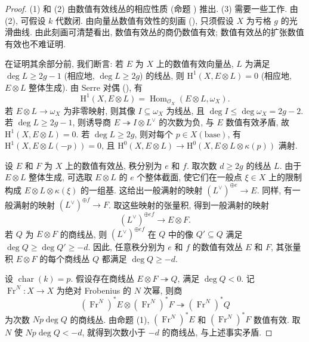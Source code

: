 \begin{proof}
(1) 和 (2) 由数值有效线丛的相应性质 (命题 ) 推出. (3) 需要一些工作. 由 (2), 可假设 $k$ 代数闭. 由向量丛数值有效性的刻画 (), 只须假设 $X$ 为亏格 $g$ 的光滑曲线. 由此刻画可清楚看出, 数值有效丛的商仍数值有效; 数值有效丛的扩张数值有效也不难证明.

在证明其余部分前, 我们断言: 若 $E$ 为 $X$ 上的数值有效向量丛, $L$ 为满足 $\deg L\geq2g-1$ (相应地, $\deg L\geq2g$) 的线丛, 则 $\mathrm H^1(X,E\otimes L)=0$ (相应地, $E\otimes L$ 整体生成). 由 Serre 对偶 (), 有
\[
\mathrm H^1(X,E\otimes L)=\operatorname{Hom}_{\mathcal O_X}(E\otimes L,\omega_X).
\]
若 $E\otimes L\to\omega_X$ 为非零映射, 则其像 $I\subseteq\omega_X$ 为线丛, 且 $\deg I\leq\deg\omega_X=2g-2$. 若 $\deg L\geq2g-1$, 则诱导商 $E\twoheadrightarrow I\otimes L^\vee$ 的次数为负, 与 $E$ 数值有效矛盾, 故 $\mathrm H^1(X,E\otimes L)=0$. 若 $\deg L\geq2g$, 则对每个 $p\in X(\mathrm{base})$, 有 $\mathrm H^1(X,E\otimes L(-p))=0$, 且 $\mathrm H^0(X,E\otimes L)\to\mathrm H^0(X,E\otimes L\otimes\kappa(p))$ 满射.

设 $E$ 和 $F$ 为 $X$ 上的数值有效丛, 秩分别为 $e$ 和 $f$. 取次数 $d\geq2g$ 的线丛 $L$. 由于 $E\otimes L$ 整体生成, 可选取 $E\otimes L$ 的 $e$ 个整体截面, 使它们在一般点 $\xi\in X$ 上的限制构成 $E\otimes L\otimes\kappa(\xi)$ 的一组基. 这给出一般满射的映射 $(L^\vee)^{\oplus e}\to E$. 同样, 有一般满射的映射 $(L^\vee)^{\oplus f}\to F$. 取这些映射的张量积, 得到一般满射的映射
\[
(L^\vee)^{\oplus ef}\longrightarrow E\otimes F.
\]
若 $Q$ 为 $E\otimes F$ 的商线丛, 则 $(L^\vee)^{\oplus ef}$ 在 $Q$ 中的像 $Q'\subseteq Q$ 满足 $\deg Q\geq\deg Q'\geq-d$. 因此, 任意秩分别为 $e$ 和 $f$ 的数值有效丛 $E$ 和 $F$, 其张量积 $E\otimes F$ 的每个商线丛 $Q$ 都满足 $\deg Q\geq-d$.

设 $\operatorname{char}(k)=p$. 假设存在商线丛 $E\otimes F\twoheadrightarrow Q$, 满足 $\deg Q<0$. 记 $\operatorname{Fr}^N:X\to X$ 为绝对 Frobenius 的 $N$ 次幂, 则商
\[
(\operatorname{Fr}^N)^*E\otimes(\operatorname{Fr}^N)^*F
\twoheadrightarrow(\operatorname{Fr}^N)^*Q
\]
为次数 $Np\deg Q$ 的商线丛. 由命题 (1), $(\operatorname{Fr}^N)^*E$ 和 $(\operatorname{Fr}^N)^*F$ 数值有效. 取 $N$ 使 $Np\deg Q<-d$, 就得到次数小于 $-d$ 的商线丛, 与上述事实矛盾.


\end{proof}
